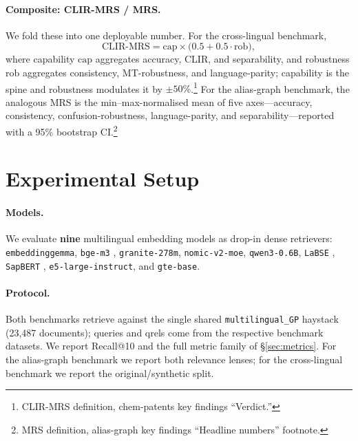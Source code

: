 \documentclass[11pt]{article}
\begin{document}
\paragraph{Composite: CLIR-MRS / MRS.}
We fold these into one deployable number. For the cross-lingual benchmark,
\begin{equation}
\label{eq:clirmrs}
\mathrm{CLIR\text{-}MRS} = \mathrm{cap} \times \bigl(0.5 + 0.5\cdot\mathrm{rob}\bigr),
\end{equation}
where capability $\mathrm{cap}$ aggregates accuracy, CLIR, and separability, and
robustness $\mathrm{rob}$ aggregates consistency, MT-robustness, and
language-parity; capability is the spine and robustness modulates it by
$\pm50\%$.\footnote{CLIR-MRS definition, chem-patents key findings ``Verdict.''}
For the alias-graph benchmark, the analogous MRS is the min--max-normalised mean
of five axes---accuracy, consistency, confusion-robustness, language-parity, and
separability---reported with a 95\% bootstrap CI.\footnote{MRS definition,
alias-graph key findings ``Headline numbers'' footnote.}

\section{Experimental Setup}
\label{sec:setup}

\paragraph{Models.}
We evaluate \textbf{nine} multilingual embedding models as drop-in dense
retrievers: \texttt{embeddinggemma}, \texttt{bge-m3} \citep{bgem3_2024},
\texttt{granite-278m}, \texttt{nomic-v2-moe}, \texttt{qwen3-0.6B},
\texttt{LaBSE} \citep{labse2022}, \texttt{SapBERT} \citep{sapbert2021},
\texttt{e5-large-instruct}, and \texttt{gte-base}.

\paragraph{Protocol.}
Both benchmarks retrieve against the single shared \texttt{multilingual\_GP}
haystack (23{,}487 documents); queries and qrels come from the respective
benchmark datasets. We report Recall@10 and the full metric family of
\S\ref{sec:metrics}. For the alias-graph benchmark we report both relevance
lenses; for the cross-lingual benchmark we report the original/synthetic split.
\end{document}
